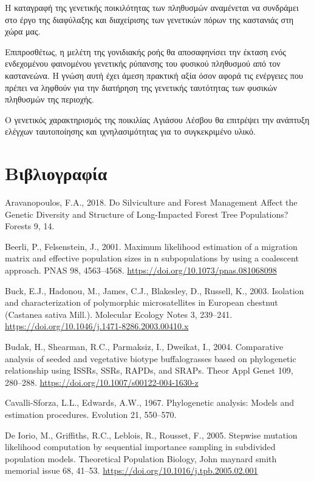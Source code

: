 \documentclass[12pt,a4paper,]{report}
\begin{document}
H καταγραφή της γενετικής ποικιλότητας των πληθυσμών αναμένεται να
συνδράμει στο έργο της διαφύλαξης και διαχείρισης των γενετικών πόρων
της καστανιάς στη χώρα μας.

Επιπροσθέτως, η μελέτη της γονιδιακής ροής θα αποσαφηνίσει την έκταση
ενός ενδεχομένου φαινομένου γενετικής ρύπανσης του φυσικού πληθυσμού από
τον καστανεώνα. Η γνώση αυτή έχει άμεση πρακτική αξία όσον αφορά τις
ενέργειες που πρέπει να ληφθούν για την διατήρηση της γενετικής
ταυτότητας των φυσικών πληθυσμών της περιοχής.

Ο γενετικός χαρακτηρισμός της ποικιλίας Αγιάσου Λέσβου θα επιτρέψει την
ανάπτυξη ελέγχων ταυτοποίησης και ιχνηλασιμότητας για το συγκεκριμένο
υλικό.

\section{Βιβλιογραφία}

\hypertarget{refs}{}
\leavevmode\hypertarget{ref-Aravanopoulos2018a}{}%
Aravanopoulos, F.A., 2018. Do Silviculture and Forest Management Affect
the Genetic Diversity and Structure of Long-Impacted Forest Tree
Populations? Forests 9, 14.

\leavevmode\hypertarget{ref-beerli_maximum_2001}{}%
Beerli, P., Felsenstein, J., 2001. Maximum likelihood estimation of a
migration matrix and effective population sizes in n subpopulations by
using a coalescent approach. PNAS 98, 4563--4568.
\url{https://doi.org/10.1073/pnas.081068098}

\leavevmode\hypertarget{ref-buck_isolation_2003}{}%
Buck, E.J., Hadonou, M., James, C.J., Blakesley, D., Russell, K., 2003.
Isolation and characterization of polymorphic microsatellites in
European chestnut (Castanea sativa Mill.). Molecular Ecology Notes 3,
239--241. \url{https://doi.org/10.1046/j.1471-8286.2003.00410.x}

\leavevmode\hypertarget{ref-budak_comparative_2004}{}%
Budak, H., Shearman, R.C., Parmaksiz, I., Dweikat, I., 2004. Comparative
analysis of seeded and vegetative biotype buffalograsses based on
phylogenetic relationship using ISSRs, SSRs, RAPDs, and SRAPs. Theor
Appl Genet 109, 280--288.
\url{https://doi.org/10.1007/s00122-004-1630-z}

\leavevmode\hypertarget{ref-cavalli1967phylogenetic}{}%
Cavalli-Sforza, L.L., Edwards, A.W., 1967. Phylogenetic analysis: Models
and estimation procedures. Evolution 21, 550--570.

\leavevmode\hypertarget{ref-de_iorio_stepwise_2005}{}%
De Iorio, M., Griffiths, R.C., Leblois, R., Rousset, F., 2005. Stepwise
mutation likelihood computation by sequential importance sampling in
subdivided population models. Theoretical Population Biology, John
maynard smith memorial issue 68, 41--53.
\url{https://doi.org/10.1016/j.tpb.2005.02.001}
\end{document}
